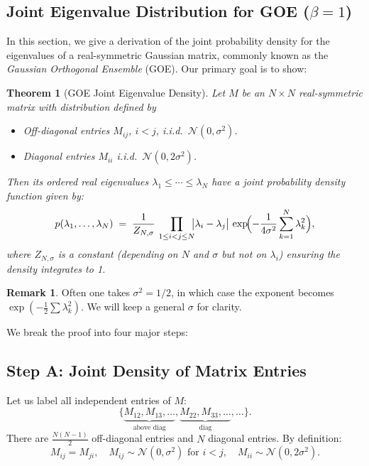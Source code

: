 \documentclass[letterpaper,11pt,oneside,reqno]{article}
\numberwithin{equation}{section}
\newtheorem{theorem}[proposition]{Theorem}
\theoremstyle{definition}
\newtheorem{remark}[proposition]{Remark}
\begin{document}
\subsection{Joint Eigenvalue Distribution for GOE (\(\beta = 1\))}
\label{sub:GOE-derivation}

In this section, we give a derivation of the joint probability density for the eigenvalues of a real-symmetric Gaussian matrix, commonly known as the \emph{Gaussian Orthogonal Ensemble} (GOE). Our primary goal is to show:

\begin{theorem}[GOE Joint Eigenvalue Density]
\label{thm:GOE-joint-eigs-detailed}
Let \(M\) be an \(N\times N\) real-symmetric matrix with distribution defined by
\begin{itemize}
\item Off-diagonal entries \(M_{ij}\), \(i<j\), i.i.d.\ \(\mathcal{N}(0,\sigma^2)\).
\item Diagonal entries \(M_{ii}\) i.i.d.\ \(\mathcal{N}(0,2\sigma^2)\).
\end{itemize}
Then its ordered real eigenvalues \(\lambda_1 \le \cdots \le \lambda_N\) have a joint probability density function given by:
\[
  p(\lambda_1,\ldots,\lambda_N)
  \;=\;\frac{1}{Z_{N,\sigma}}
  \,\prod_{1 \le i < j \le N}
  \!\!\bigl|\lambda_i - \lambda_j\bigr|\,
  \exp\!\Bigl(
    -\frac{1}{4\sigma^2}\sum_{k=1}^N \lambda_k^2
  \Bigr),
\]
where \(Z_{N,\sigma}\) is a constant (depending on \(N\) and \(\sigma\) but not on \(\lambda_i\)) ensuring the density integrates to 1.
\end{theorem}

\begin{remark}
Often one takes \(\sigma^2=1/2\), in which case the exponent becomes \(\exp(-\frac12\sum \lambda_k^2)\). We will keep a general \(\sigma\) for clarity.
\end{remark}

We break the proof into four major steps:

\subsection{Step A: Joint Density of Matrix Entries}
\label{subsec:density-entries}

Let us label all independent entries of \(M\):
\[
  \{\underbrace{M_{12}, M_{13},\dots}_{\text{above diag}},
  \underbrace{M_{22}, M_{33},\dots}_{\text{diag}}, \ldots \}.
\]
There are \(\frac{N(N-1)}{2}\) off-diagonal entries and \(N\) diagonal entries. By definition:
\[
  M_{ij} = M_{ji}, \quad
  M_{ij}\sim \mathcal{N}(0,\sigma^2)\text{ for } i<j,
  \quad
  M_{ii}\sim \mathcal{N}(0,2\sigma^2).
\]
\end{document}
